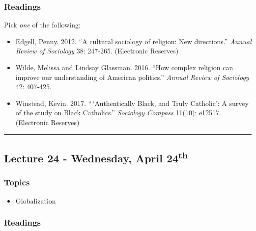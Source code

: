 \documentclass[]{book}
\providecommand{\tightlist}{%
  \setlength{\itemsep}{0pt}\setlength{\parskip}{0pt}}
\begin{document}
\hypertarget{readings-25}{%
\subsubsection*{Readings}\label{readings-25}}

Pick \emph{one} of the following:

\begin{itemize}
\tightlist
\item
  Edgell, Penny. 2012. ``A cultural sociology of religion: New directions.'' \emph{Annual Review of Sociology} 38: 247-265. (Electronic Reserves)
\item
  Wilde, Melissa and Lindsay Glassman. 2016. ``How complex religion can improve our understanding of American politics.'' \emph{Annual Review of Sociology} 42: 407-425.
\item
  Winstead, Kevin. 2017. ``\,`Authentically Black, and Truly Catholic': A survey of the study on Black Catholics.'' \emph{Sociology Compass} 11(10): e12517. (Electronic Reserves)
\end{itemize}

\begin{center}\rule{0.5\linewidth}{\linethickness}\end{center}

\hypertarget{lecture-24---wednesday-april-24th}{%
\subsection*{\texorpdfstring{Lecture 24 - Wednesday, April 24\textsuperscript{th}}{Lecture 24 - Wednesday, April 24th}}\label{lecture-24---wednesday-april-24th}}

\hypertarget{topics-28}{%
\subsubsection*{Topics}\label{topics-28}}

\begin{itemize}
\tightlist
\item
  Globalization
\end{itemize}

\hypertarget{readings-26}{%
\subsubsection*{Readings}\label{readings-26}}
\end{document}

